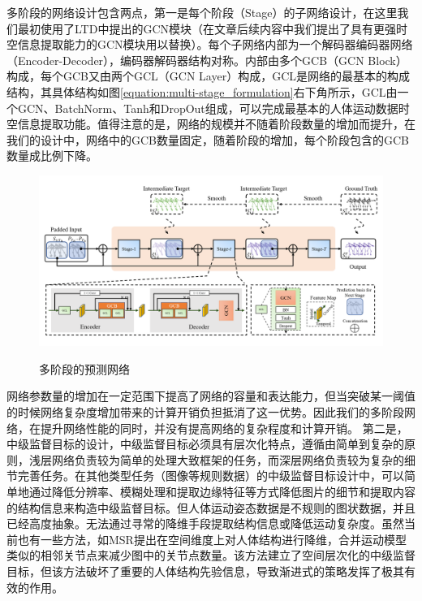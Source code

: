 多阶段的网络设计包含两点，第一是每个阶段（Stage）的子网络设计，在这里我们最初使用了LTD中提出的GCN模块（在文章后续内容中我们提出了具有更强时空信息提取能力的GCN模块用以替换）。每个子网络内部为一个解码器编码器网络（Encoder-Decoder），编码器解码器结构对称。内部由多个GCB（GCN Block）构成，每个GCB又由两个GCL（GCN Layer）构成，GCL是网络的最基本的构成结构，其具体结构如图\ref{equation:multi-stage_formulation}右下角所示，GCL由一个GCN、BatchNorm、Tanh和DropOut组成，可以完成最基本的人体运动数据时空信息提取功能。值得注意的是，网络的规模并不随着阶段数量的增加而提升，在我们的设计中，网络中的GCB数量固定，随着阶段的增加，每个阶段包含的GCB数量成比例下降。
\begin{figure}[ht]
    \centering
    \includegraphics[width=1\textwidth]{FigMa/multi-stage_network.png}\\
    \vspace{-0.3cm}
    \caption{多阶段的预测网络}
    \label{fig:multi_stage}
\end{figure}
网络参数量的增加在一定范围下提高了网络的容量和表达能力，但当突破某一阈值的时候网络复杂度增加带来的计算开销负担抵消了这一优势。因此我们的多阶段网络，在提升网络性能的同时，并没有提高网络的复杂程度和计算开销。
第二是，中级监督目标的设计，中级监督目标必须具有层次化特点，遵循由简单到复杂的原则，浅层网络负责较为简单的处理大致框架的任务，而深层网络负责较为复杂的细节完善任务。在其他类型任务（图像等规则数据）的中级监督目标设计中，可以简单地通过降低分辨率、模糊处理和提取边缘特征等方式降低图片的细节和提取内容的结构信息来构造中级监督目标。但人体运动姿态数据是不规则的图状数据，并且已经高度抽象。无法通过寻常的降维手段提取结构信息或降低运动复杂度。虽然当前也有一些方法，如MSR\parencite{dang2021msr}提出在空间维度上对人体结构进行降维，合并运动模型类似的相邻关节点来减少图中的关节点数量。该方法建立了空间层次化的中级监督目标，但该方法破坏了重要的人体结构先验信息，导致渐进式的策略发挥了极其有效的作用。

